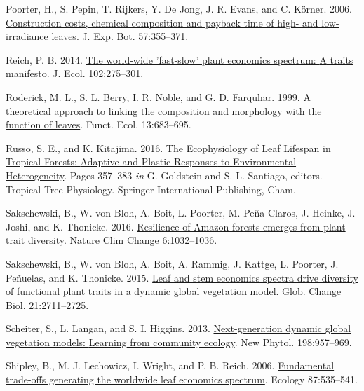 \documentclass[
  12pt,
]{article}
\newlength{\cslhangindent}
\newlength{\cslentryspacingunit} %
\newenvironment{CSLReferences}[2] %
 {%
  \setlength{\parindent}{0pt}
  \ifodd #1
  \let\oldpar\par
  \def\par{\hangindent=\cslhangindent\oldpar}
  \fi
  \setlength{\parskip}{#2\cslentryspacingunit}
 }%
 {}
\begin{document}
\begin{CSLReferences}{1}{0}
\leavevmode{}%
Poorter, H., S. Pepin, T. Rijkers, Y. De Jong, J. R. Evans, and C. Körner. 2006. \href{https://doi.org/10.1093/jxb/erj002}{Construction costs, chemical composition and payback time of high- and low-irradiance leaves}. J. Exp. Bot. 57:355--371.

\leavevmode{}%
Reich, P. B. 2014. \href{https://doi.org/10.1111/1365-2745.12211}{The world-wide 'fast-slow' plant economics spectrum: {A} traits manifesto}. J. Ecol. 102:275--301.

\leavevmode{}%
Roderick, M. L., S. L. Berry, I. R. Noble, and G. D. Farquhar. 1999. \href{https://doi.org/10.1046/j.1365-2435.1999.00368.x}{A theoretical approach to linking the composition and morphology with the function of leaves}. Funct. Ecol. 13:683--695.

\leavevmode{}%
Russo, S. E., and K. Kitajima. 2016. \href{https://doi.org/10.1007/978-3-319-27422-5_17}{The {Ecophysiology} of {Leaf Lifespan} in {Tropical Forests}: {Adaptive} and {Plastic Responses} to {Environmental Heterogeneity}}. Pages 357--383 \emph{in} G. Goldstein and S. L. Santiago, editors. Tropical {Tree Physiology}. {Springer International Publishing}, {Cham}.

\leavevmode{}%
Sakschewski, B., W. von Bloh, A. Boit, L. Poorter, M. Peña-Claros, J. Heinke, J. Joshi, and K. Thonicke. 2016. \href{https://doi.org/10.1038/nclimate3109}{Resilience of {Amazon} forests emerges from plant trait diversity}. Nature Clim Change 6:1032--1036.

\leavevmode{}%
Sakschewski, B., W. von Bloh, A. Boit, A. Rammig, J. Kattge, L. Poorter, J. Peñuelas, and K. Thonicke. 2015. \href{https://doi.org/10.1111/gcb.12870}{Leaf and stem economics spectra drive diversity of functional plant traits in a dynamic global vegetation model}. Glob. Change Biol. 21:2711--2725.

\leavevmode{}%
Scheiter, S., L. Langan, and S. I. Higgins. 2013. \href{https://doi.org/10.1111/nph.12210}{Next-generation dynamic global vegetation models: {Learning} from community ecology}. New Phytol. 198:957--969.

\leavevmode{}%
Shipley, B., M. J. Lechowicz, I. Wright, and P. B. Reich. 2006. \href{https://doi.org/10.1890/05-1051}{Fundamental trade-offs generating the worldwide leaf economics spectrum}. Ecology 87:535--541.


\end{CSLReferences}
\end{document}
